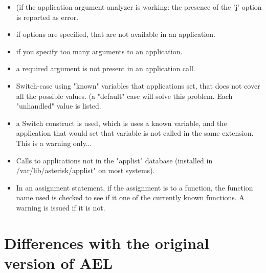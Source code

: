 {\begin{itemize}
    \item (if the application argument analyzer is working: the presence
      of the 'j' option is reported as error.
    \item if options are specified, that are not available in an
      application.
    \item if you specify too many arguments to an application.
    \item a required argument is not present in an application call.
    \item Switch-case using "known" variables that applications set, that
      does not cover all the possible values. (a "default" case will
      solve this problem. Each "unhandled" value is listed.
    \item a Switch construct is used, which is uses a known variable, and
      the application that would set that variable is not called in
      the same extension. This is a warning only...
    \item Calls to applications not in the "applist" database (installed
      in /var/lib/asterisk/applist" on most systems).
    \item In an assignment statement, if the assignment is to a function,
      the function name used is checked to see if it one of the
      currently known functions. A warning is issued if it is not.
\end{itemize}

\section{Differences with the original version of AEL}

}
